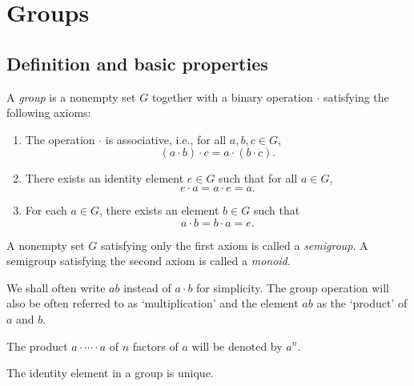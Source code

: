\chapter{Groups}
\label{ch:groups}

\section{Definition and basic properties}

\begin{definition}
    A \emph{group} is a nonempty set \(G\) together with a binary operation
    \(\cdot\) satisfying the following axioms:
    \begin{enumerate}
        \item The operation \(\cdot\) is associative, i.e., for all \(a, b, c
        \in G\),
        \[
            (a \cdot b) \cdot c = a \cdot (b \cdot c).
        \]
        \item There exists an identity element \(e \in G\) such that for all \(a
        \in G\),
        \[
            e \cdot a = a \cdot e = a.
        \]
        \item For each \(a \in G\), there exists an element \(b \in G\) such
        that
        \[
            a \cdot b = b \cdot a = e.
        \]
    \end{enumerate}
\end{definition}

\begin{remark}
    A nonempty set \(G\) satisfying only the first axiom is called a
    \emph{semigroup}. A semigroup satisfying the second axiom is called a
    \emph{monoid}. 
\end{remark}

\begin{remark}
    We shall often write \(ab\) instead of \(a \cdot b\) for simplicity. The
    group operation will also be often referred to as `multiplication' and the
    element \(ab\) as the `product' of \(a\) and \(b\).
\end{remark}

\begin{notation}\label{notation:exponential} The product
    \(a \cdot \cdots \cdot a\) of \(n\) factors of \(a\) will be denoted by
    \(a^n\).
\end{notation}


\begin{theorem}
    The identity element in a group is unique.
\end{theorem}

